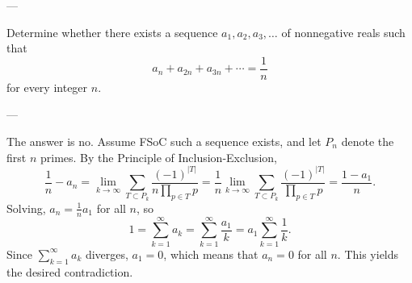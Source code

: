 
---

Determine whether there exists a sequence $a_1,a_2,a_3,\ldots$ of nonnegative reals such that \[a_n+a_{2n}+a_{3n}+\cdots=\frac1n\]
for every integer $n$.

---

The answer is no. Assume FSoC such a sequence exists, and let $P_n$ denote the first $n$ primes. By the Principle of Inclusion-Exclusion, \[\frac1n-a_n=\lim_{k\to\infty}\sum_{T\subset P_k}\frac{(-1)^{|T|}}{n\prod_{p\in T}p}=\frac1n\lim_{k\to\infty}\sum_{T\subset P_k}\frac{(-1)^{|T|}}{\prod_{p\in T}p}=\frac{1-a_1}n.\]
Solving, $a_n=\tfrac1na_1$ for all $n$, so \[1=\sum_{k=1}^\infty a_k=\sum_{k=1}^\infty\frac{a_1}k=a_1\sum_{k=1}^\infty\frac1k.\]
Since $\sum_{k=1}^\infty a_k$ diverges, $a_1=0$, which means that $a_n=0$ for all $n$. This yields the desired contradiction.

